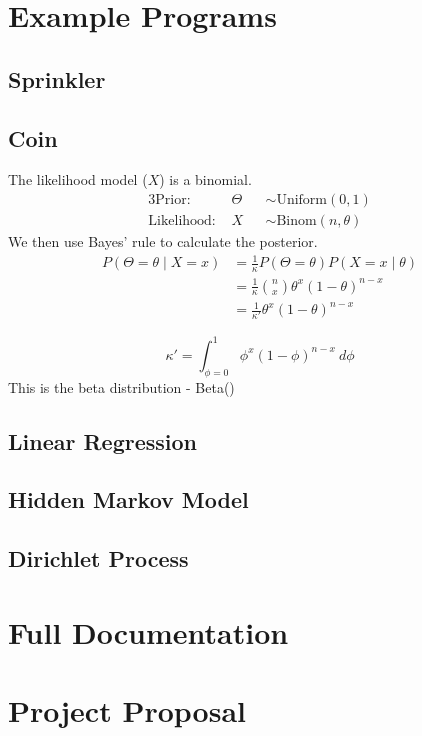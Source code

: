 \documentclass[12pt,notitlepage,a4paper]{report}
\begin{document}
\chapter{Example Programs} \label{app:examples}
\section{Sprinkler} \label{app:sprinkler}
\section{Coin} \label{app:coin}
The likelihood model ($X$) is a binomial.
% 
\begin{alignat*}{3}
	\text{Prior:~}      & \Theta &   & \sim \text{Uniform}(0,1)    \\
	\text{Likelihood:~} & X      &   & \sim \text{Binom}(n,\theta) 
\end{alignat*}
% 
We then use Bayes' rule to calculate the posterior.
\begin{align*}
	P(\Theta=\theta \mid X=x) & = \frac{1}{\kappa}P(\Theta=\theta)P(X=x\mid\theta)     \\ 
	                          & = \frac{1}{\kappa}\binom{n}{x}\theta^x(1-\theta)^{n-x} \\
	                          & = \frac{1}{\kappa'}\theta^x(1-\theta)^{n-x}            
\end{align*}

\[\kappa'=\int_{\phi=0}^1\phi^x(1-\phi)^{n-x}~d\phi\]
This is the beta distribution - Beta()
\section{Linear Regression} \label{app:linreg}
\section{Hidden Markov Model} \label{app:hmm}
\section{Dirichlet Process} \label{app:dp}

\chapter{Full Documentation} \label{app:docs}
% 

\chapter{Project Proposal}

\end{document}
